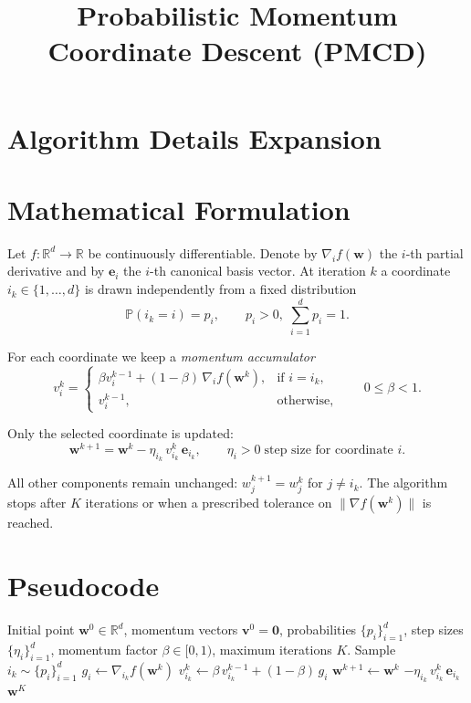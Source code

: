\documentclass[11pt]{article}
\title{Probabilistic Momentum Coordinate Descent (PMCD)}
\author{}
\date{}
\begin{document}
\maketitle

\section*{Algorithm Details Expansion}

\section{Mathematical Formulation}
Let $f:\mathbb{R}^d\rightarrow\mathbb{R}$ be continuously differentiable.
Denote by $\nabla_i f(\mathbf w)$ the $i$-th partial derivative and by
$\mathbf e_i$ the $i$-th canonical basis vector.
At iteration $k$ a coordinate $i_k\in\{1,\dots ,d\}$ is drawn
independently from a fixed distribution 
\[
\mathbb P(i_k = i)=p_i,\qquad p_i>0,\;\sum_{i=1}^d p_i =1 .
\]

For each coordinate we keep a \emph{momentum accumulator}
\[
v_i^{k}= \begin{cases}
\beta v_i^{k-1} + (1-\beta)\,\nabla_i f(\mathbf w^{k}) , & \text{if } i=i_k,\\[4pt]
v_i^{k-1}, & \text{otherwise},
\end{cases}
\qquad 0\le \beta<1 .
\]

Only the selected coordinate is updated:
\[
\boxed{
\mathbf w^{k+1}= \mathbf w^{k}
- \eta_{i_k}\, v_{i_k}^{k}\,\mathbf e_{i_k}},
\qquad \eta_{i}>0\;\text{step size for coordinate }i .
\]

All other components remain unchanged:
$w^{k+1}_j = w^{k}_j$ for $j\neq i_k$.
The algorithm stops after $K$ iterations or when a prescribed
tolerance on $\| \nabla f(\mathbf w^k)\|$ is reached.

\section{Pseudocode}
\begin{algorithm}[H]
\caption{Probabilistic Momentum Coordinate Descent (PMCD)}
\begin{algorithmic}[1]
\Require Initial point $\mathbf w^{0}\in\mathbb R^{d}$,
        momentum vectors $\mathbf v^{0}= \mathbf 0$,
        probabilities $\{p_i\}_{i=1}^d$,
        step sizes $\{\eta_i\}_{i=1}^d$,
        momentum factor $\beta\in[0,1)$,
        maximum iterations $K$.
    \State Sample $i_k\sim\{p_i\}_{i=1}^d$ 
    \State $g_i \gets \nabla_{i_k} f(\mathbf w^{k})$ 
    \State $v_{i_k}^{k} \gets \beta\,v_{i_k}^{k-1} + (1-\beta)\,g_i$ 
    \State $\mathbf w^{k+1} \gets \mathbf w^{k}$ 
    \State \hspace{1.8cm}$ - \eta_{i_k}\,v_{i_k}^{k}\,\mathbf e_{i_k}$ 
\EndFor
\State \Return $\mathbf w^{K}$
\end{algorithmic}
\end{algorithm}
\end{document}
